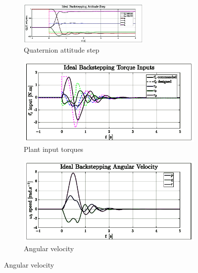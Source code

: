 \begin{figure}[htbp]
\vspace{-10pt}
\centering
\begin{subfigure}{\textwidth}
\centering
\includegraphics[width=0.7\textwidth]{graphs/IBC_Step}
\vspace{-6pt}
\caption{Quaternion attitude step}
\label{fig:IBC_Step}
\end{subfigure}
\begin{subfigure}{0.49\textwidth}
\centering
\includegraphics[width=\textwidth]{graphs/IBC_Torque}
\vspace{-20pt}
\caption{Plant input torques}
\label{fig:IBC_Torque}
\end{subfigure}
\begin{subfigure}{0.49\textwidth}
\centering
\includegraphics[width=\textwidth]{graphs/IBC_Angular}
\vspace{-20pt}
\caption{Angular velocity}
\label{fig:IBC_Angular}
\end{subfigure}

\end{figure}
